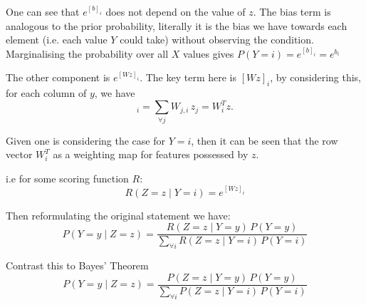 \documentclass[12pt,parskip]{komatufte}
\begin{document}
One can see that $e^{[b]_{i}}$ does not depend on the value of $z$.
The bias term is analogous to the prior probability, literally it is the bias we have towards each element (i.e. each value $Y$ could take) without observing the condition.
Marginalising the probability over all $X$ values gives $P(Y=i)=e^{[b]_{i}}=e^{b_{i}}$


The other component is $e^{[Wz]_{i}}$.
The key term here is $[Wz]_{i}$, by considering this, for each column of $y$,
we have 
\begin{equation}
[Wz]_{i}=\sum_{\forall j}W_{j,i}\,z_{j}=W_{i}^{T}z.
\end{equation}

Given one is considering the case for $Y=i$, then 
it can be seen that the row vector $W_{i}^{T}$ as a weighting map for features possessed by $z$.

i.e for some scoring function $R$:
\begin{equation}
R(Z=z\mid Y=i)=e^{[Wz]_{i}}
\end{equation}


Then reformulating the original statement we have:
\begin{equation}
P(Y=y\mid Z=z)=\frac{R(Z=z\mid Y=y)\,P(Y=y)}{\sum_{\forall i}R(Z=z\mid Y=i)\,P(Y=i)}
\end{equation}

Contrast this to Bayes' Theorem
\begin{equation}
P(Y=y\mid Z=z)=\frac{P(Z=z\mid Y=y)\,P(Y=y)}{\sum_{\forall i}P(Z=z\mid Y=i)\,P(Y=i)}
\end{equation}
\end{document}
